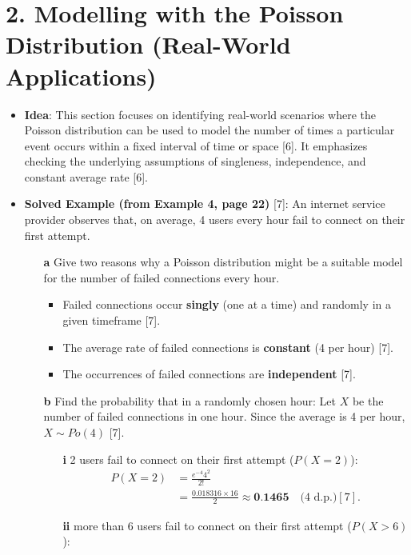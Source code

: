 \documentclass[12pt]{article}
\begin{document}
\section*{2. Modelling with the Poisson Distribution (Real-World Applications)}

\begin{itemize}
    \item \textbf{Idea}: This section focuses on identifying real-world scenarios where the Poisson distribution can be used to model the number of times a particular event occurs within a fixed interval of time or space [6]. It emphasizes checking the underlying assumptions of singleness, independence, and constant average rate [6].

    \item \textbf{Solved Example (from Example 4, page 22)} [7]:
    An internet service provider observes that, on average, 4 users every hour fail to connect on their first attempt.
    \begin{enumerate}
        \item[\textbf{a}] Give two reasons why a Poisson distribution might be a suitable model for the number of failed connections every hour.
        \begin{itemize}
            \item Failed connections occur \textbf{singly} (one at a time) and randomly in a given timeframe [7].
            \item The average rate of failed connections is \textbf{constant} (4 per hour) [7].
            \item The occurrences of failed connections are \textbf{independent} [7].
        \end{itemize}
        \item[\textbf{b}] Find the probability that in a randomly chosen hour:
        Let $X$ be the number of failed connections in one hour. Since the average is 4 per hour, $X \sim Po(4)$ [7].
        \begin{enumerate}
            \item[\textbf{i}] 2 users fail to connect on their first attempt ($P(X=2)$):
            \begin{align*}
            P(X=2) &= \frac{e^{-4} 4^2}{2!} \\
            &= \frac{0.018316 \times 16}{2} \approx \textbf{0.1465} \quad \text{(4 d.p.)} [7].
            \end{align*}
            \item[\textbf{ii}] more than 6 users fail to connect on their first attempt ($P(X > 6)$):

\end{enumerate}
\end{enumerate}
\end{itemize}
\end{document}
